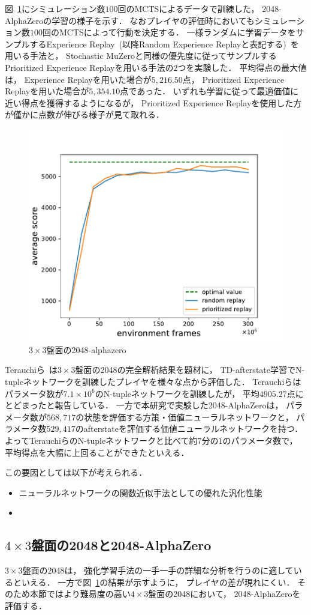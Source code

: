 図~\ref{fig:alphazero_3x3}にシミュレーション数$100$回のMCTSによるデータで訓練した， 2048-AlphaZeroの学習の様子を示す．
なおプレイヤの評価時においてもシミュレーション数$100$回のMCTSによって行動を決定する．
一様ランダムに学習データをサンプルするExperience Replay~(以降Random Experience Replayと表記する)~を用いる手法と， Stochastic MuZeroと同様の優先度に従ってサンプルするPrioritized Experience Replayを用いる手法の$2$つを実験した．
平均得点の最大値は， Experience Replayを用いた場合が$5,216.50$点， Prioritized Experience Replayを用いた場合が$5,354.10$点であった．
いずれも学習に従って最適価値に近い得点を獲得するようになるが， Prioritized Experience Replayを使用した方が僅かに点数が伸びる様子が見て取れる．
\begin{figure}[t]
    \centering
    \includegraphics[width=0.7\linewidth{}]{figures/alphazero_3x3.pdf}
    \caption{$3\times3$盤面の2048-alphazero}
    \label{fig:alphazero_3x3}
\end{figure}

Terauchiら~\cite{Min2048_matsuzaki}は$3\times3$盤面の2048の完全解析結果を題材に， TD-afterstate学習でN-tupleネットワークを訓練したプレイヤを様々な点から評価した．
Terauchiらはパラメータ数が$7.1\times{10}^6$のN-tupleネットワークを訓練したが， 平均$4905.27$点にとどまったと報告している．
一方で本研究で実験した2048-AlphaZeroは， パラメータ数が$568,717$の状態を評価する方策・価値ニューラルネットワークと， パラメータ数$529,417$のafterstateを評価する価値ニューラルネットワークを持つ．
よってTerauchiらのN-tupleネットワークと比べて約$7$分の$1$のパラメータ数で， 平均得点を大幅に上回ることができたといえる．

この要因としては以下が考えられる．
\begin{itemize}
    \item ニューラルネットワークの関数近似手法としての優れた汎化性能
    \item 
\end{itemize}

\subsection{$4\times3$盤面の2048と2048-AlphaZero}
$3\times3$盤面の2048は， 強化学習手法の一手一手の詳細な分析を行うのに適しているといえる．
一方で図~\ref{fig:alphazero_3x3}の結果が示すように， プレイヤの差が現れにくい．
そのため本節ではより難易度の高い$4\times3$盤面の2048において， 2048-AlphaZeroを評価する．